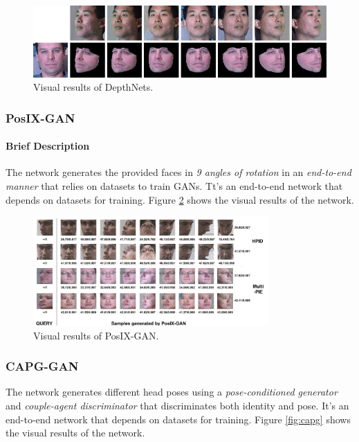 \begin{figure}[H]
    \centering
    \includegraphics[width=\textwidth]{images/depthnets.png}
    \caption{Visual results of DepthNets.}
    \label{fig:dn}
\end{figure}

\subsubsection{PosIX-GAN}

\paragraph{Brief Description}
The network \cite{inbook} generates the provided faces in \emph{9 angles of rotation} in an \emph{end-to-end manner} that relies on datasets to train GANs. Tt's an end-to-end network that depends on datasets for training. Figure \ref{fig:posix} shows the visual results of the network.

\begin{figure}[H]
    \centering
    \includegraphics[width=0.8\textwidth]{images/posix-gan.png}
    \caption{Visual results of PosIX-GAN.}
    \label{fig:posix}
\end{figure}

\subsubsection{CAPG-GAN}
The network \cite{8578974} generates different head poses using a \emph{pose-conditioned generator} and \emph{couple-agent discriminator} that discriminates both identity and pose. It's an end-to-end network that depends on datasets for training. Figure \ref{fig:capg} shows the visual results of the network.

